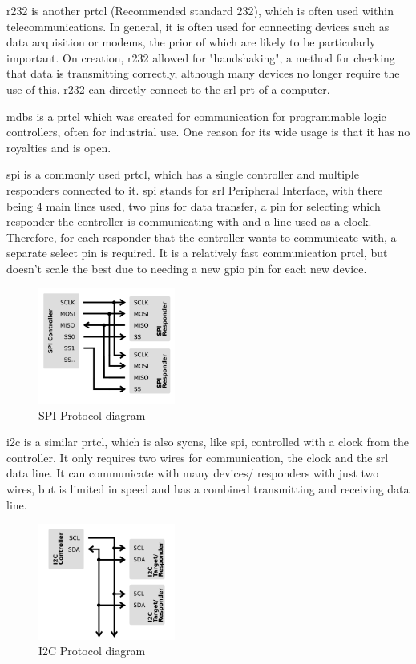 \documentclass[a4paper,11pt]{report}
\begin{document}
\gls{r232} is another \gls{prtcl} (Recommended standard 232), which is often used within telecommunications. In general, it is often used for connecting devices such as data acquisition or modems, the prior of which are likely to be particularly important. On creation, \gls{r232} allowed for "handshaking", a method for checking that data is transmitting correctly, although many devices no longer require the use of this. \gls{r232} can directly connect to the \gls{srl} \gls{prt} of a computer.

\gls{mdbs} is a \gls{prtcl} which was created for communication for programmable logic controllers, often for industrial use. One reason for its wide usage is that it has no royalties and is open.

\gls{spi} is a commonly used \gls{prtcl}, which has a single controller and multiple responders connected to it. \gls{spi} stands for \gls{srl} Peripheral Interface, with there being 4 main lines used, two pins for data transfer, a pin for selecting which responder the controller is communicating with and a line used as a clock. Therefore, for each responder that the controller wants to communicate with, a separate select pin is required. It is a relatively fast communication \gls{prtcl}, but doesn't scale the best due to needing a new \gls{gpio} pin for each new device.

\begin{figure}[H]
\centering
\includegraphics[width=0.4\textwidth]{SPI}
\caption{SPI Protocol diagram}
\end{figure}

\gls{i2c} is a similar \gls{prtcl}, which is also \gls{sycns}, like \gls{spi}, controlled with a clock from the controller. It only requires two wires for communication, the clock and the \gls{srl} data line. It can communicate with many devices/ responders with just two wires, but is limited in speed and has a combined transmitting and receiving data line.

\begin{figure}[H]
\centering
\includegraphics[width=0.4\textwidth]{I2C}
\caption{I2C Protocol diagram}
\end{figure}
\end{document}
